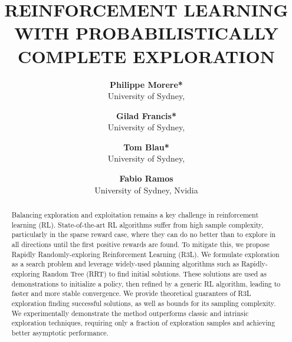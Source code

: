 \documentclass{article}
\title{REINFORCEMENT LEARNING WITH
PROBABILISTICALLY COMPLETE EXPLORATION}
\author{\textbf{Philippe Morere*}\\
University of Sydney, 
 \and \textbf{Gilad Francis*}\\
University of Sydney,
 \and \textbf{Tom Blau*}\\
University of Sydney, 
 \and \textbf{Fabio Ramos}\\
University of Sydney, Nvidia
 }
\date{}
\newcounter{n}
\begin{document}
\maketitle
\begin{abstract}
    Balancing exploration and exploitation remains a key challenge in reinforcement
learning (RL). State-of-the-art RL algorithms suffer from high sample complexity,
particularly in the sparse reward case, where they can do no better than to explore in
all directions until the first positive rewards are found. To mitigate this, we propose
Rapidly Randomly-exploring Reinforcement Learning (R3L). We formulate exploration as a search problem and leverage widely-used planning algorithms such as
Rapidly-exploring Random Tree (RRT) to find initial solutions. These solutions are
used as demonstrations to initialize a policy, then refined by a generic RL algorithm,
leading to faster and more stable convergence. We provide theoretical guarantees
of R3L exploration finding successful solutions, as well as bounds for its sampling
complexity. We experimentally demonstrate the method outperforms classic and
intrinsic exploration techniques, requiring only a fraction of exploration samples
and achieving better asymptotic performance.

\end{abstract}
\end{document}

